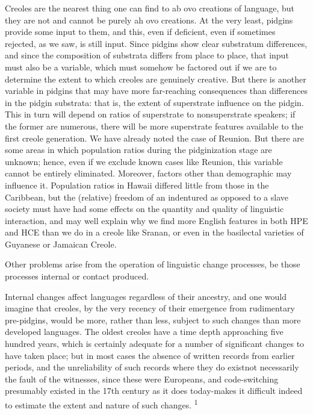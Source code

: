 Creoles are the nearest thing one can find to ab ovo creations of language, but they are not and cannot be purely ah ovo creations. At the very least, pidgins provide some input to them, and this, even if deficient, even if sometimes rejected, as we saw, is still input. Since pidgins show clear substratum differences, and since the composition of substrata differs from place to place, that input must also be a variable, which must somehow be factored out if we are to determine the extent to which creoles are genuinely creative.
But there is another variable in pidgins that may have more far-reaching consequences than differences in the pidgin substrata: that is, the extent of superstrate influence on the pidgin. This in turn will depend on ratios of superstrate to nonsuperstrate speakers; if the former are numerous, there will be more superstrate features avail\-able to the first creole generation. We have already noted the case of Reunion. But there are some areas in which population ratios during the pidginization stage are unknown; hence, even if we exclude known cases like Reunion, this variable cannot be entirely eliminated. More\-over, factors other than demographic may influence it. Population ratios in Hawaii differed little from those in the Caribbean, but the (relative) freedom of an indentured as opposed to a slave society must have had some effects on the quantity and quality of linguistic inter\-action, and may well explain why we find more English features in both HPE and HCE than we do in a creole like Sranan, or even in the basilectal varieties of Guyanese or Jamaican Creole.

Other problems arise from the operation of linguistic change processes, be those processes internal or contact produced.

Internal changes affect languages regardless of their ancestry, and one would imagine that creoles, by the very recency of their emergence from rudimentary pre-pidgins, would be more, rather than less, subject to such changes than more developed languages. The oldest creoles have a time depth approaching five hundred years, which is certainly adequate for a number of significant changes to have taken place; but in most cases the absence of written records from earlier periods, and the unreliability of such records where they do exist\-not necessarily the fault of the witnesses, since these were Europeans, and code-switching presumably existed in the 17th century as it does today-makes it difficult indeed to estimate the extent and nature of such changes. \textsuperscript{1}

